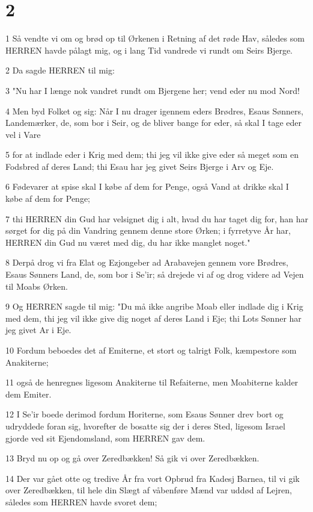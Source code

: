 \chapter{2}

\par 1 Så vendte vi om og brød op til Ørkenen i Retning af det røde Hav, således som HERREN havde pålagt mig, og i lang Tid vandrede vi rundt om Seirs Bjerge.
\par 2 Da sagde HERREN til mig:
\par 3 "Nu har I længe nok vandret rundt om Bjergene her; vend eder nu mod Nord!
\par 4 Men byd Folket og sig: Når I nu drager igennem eders Brødres, Esaus Sønners, Landemærker, de, som bor i Seir, og de bliver bange for eder, så skal I tage eder vel i Vare
\par 5 for at indlade eder i Krig med dem; thi jeg vil ikke give eder så meget som en Fodsbred af deres Land; thi Esau har jeg givet Seirs Bjerge i Arv og Eje.
\par 6 Fødevarer at spise skal I købe af dem for Penge, også Vand at drikke skal I købe af dem for Penge;
\par 7 thi HERREN din Gud har velsignet dig i alt, hvad du har taget dig for, han har sørget for dig på din Vandring gennem denne store Ørken; i fyrretyve År har, HERREN din Gud nu været med dig, du har ikke manglet noget."
\par 8 Derpå drog vi fra Elat og Ezjongeber ad Arabavejen gennem vore Brødres, Esaus Sønners Land, de, som bor i Se'ir; så drejede vi af og drog videre ad Vejen til Moabs Ørken.
\par 9 Og HERREN sagde til mig: "Du må ikke angribe Moab eller indlade dig i Krig med dem, thi jeg vil ikke give dig noget af deres Land i Eje; thi Lots Sønner har jeg givet Ar i Eje.
\par 10 Fordum beboedes det af Emiterne, et stort og talrigt Folk, kæmpestore som Anakiterne;
\par 11 også de henregnes ligesom Anakiterne til Refaiterne, men Moabiterne kalder dem Emiter.
\par 12 I Se'ir boede derimod fordum Horiterne, som Esaus Sønner drev bort og udryddede foran sig, hvorefter de bosatte sig der i deres Sted, ligesom Israel gjorde ved sit Ejendomsland, som HERREN gav dem.
\par 13 Bryd nu op og gå over Zeredbækken! Så gik vi over Zeredbækken.
\par 14 Der var gået otte og tredive År fra vort Opbrud fra Kadesj Barnea, til vi gik over Zeredbækken, til hele din Slægt af våbenføre Mænd var uddød af Lejren, således som HERREN havde svoret dem;
